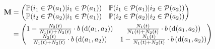 \begin{align*}
\mathbf{M} &= \begin{pmatrix} 
\mathbb{P}(i_1 \in \mathcal{P}(a_1) | i_1 \in \mathcal{P}(a_1) ) & \mathbb{P}(i_1 \in \mathcal{P}(a_1) | i_2 \in \mathcal{P}(a_2) ) \\
\mathbb{P}(i_2 \in \mathcal{P}(a_2) | i_1 \in \mathcal{P}(a_1) ) & \mathbb{P}(i_2 \in \mathcal{P}(a_2) | i_2 \in \mathcal{P}(a_2) )
\end{pmatrix} \notag \\
&= \begin{pmatrix} 
1 - \frac{N_{2}(t)}{N_1(t) + N_2(t)} \cdot b\left(\text{d}(a_1, a_2) \right) & \frac{N_{1}(t)}{N_1(t) + N_2(t)} \cdot b\left(\text{d}(a_1, a_2) \right) \\
\frac{N_{2}(t)}{N_1(t) + N_2(t)} \cdot b\left(\text{d}(a_1, a_2) \right) & 1 - \frac{N_{1}(t)}{N_1(t) + N_2(t)} \cdot b\left(\text{d}(a_1, a_2) \right)
\end{pmatrix}
\end{align*}

